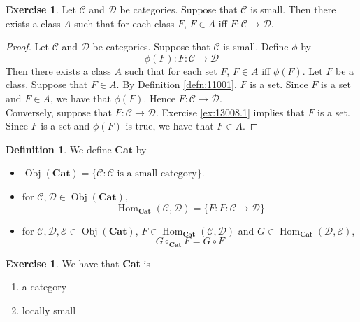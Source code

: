 \documentclass{book}
\theoremstyle{definition}
\newtheorem{defn}[definition]{Definition}
\newtheorem{ex}[definition]{Exercise}
\newcommand{\MC}{\mathcal{C}}
\newcommand{\MD}{\mathcal{D}}
\newcommand{\ME}{\mathcal{E}}
\newcommand{\lex}[1]{\label{ex:#1}}
\newcommand{\rex}[1]{Exercise \ref{ex:#1}}
\newcommand{\ld}[1]{\label{defn:#1}}
\newcommand{\rd}[1]{Definition \ref{defn:#1}}
\DeclareMathOperator{\Obj}{Obj}
\DeclareMathOperator{\Hom}{Hom}
\DeclareMathOperator*{\0}{\mbf{0}}
\DeclareMathOperator*{\1}{\mbf{1}}
\newcommand{\tbf}[1]{\textbf{#1}}
\begin{document}
	\begin{ex} \lex{13008.2}
		Let $\MC$ and $\MD$ be categories. Suppose that $\MC$ is small. Then there exists a class $A$ such that for each class $F$, $F \in A$ iff $F: \MC \rightarrow \MD$.   
	\end{ex}
	
	\begin{proof} 
		Let $\MC$ and $\MD$ be categories. Suppose that $\MC$ is small. Define $\phi$ by 
		$$\phi(F) : F : \MC \rightarrow \MD$$ 
		Then there exists a class $A$ such that for each set $F$, $F \in A$ iff $\phi(F)$. Let $F$ be a class. Suppose that $F \in A$. By \rd{11001}, $F$ is a set. Since $F$ is a set and $F \in A$, we have that $\phi(F)$. Hence $F: \MC \rightarrow \MD$. \\
		Conversely, suppose that $F: \MC \rightarrow \MD$. \rex{13008.1} implies that $F$ is a set. Since $F$ is a set and $\phi(F)$ is true, we have that $F \in A$. 
	\end{proof}
	
	\begin{defn} \ld{13009}
		We define $\tbf{Cat}$ by 
		\begin{itemize}
			\item $\Obj(\tbf{Cat}) = \{\MC: \MC \text{ is a small category}\}$.
			\item for $\MC,\MD \in \Obj(\tbf{Cat})$, 
			$$\Hom_{\tbf{Cat}}(\MC,\MD) = \{F : F: \MC \rightarrow \MD \}$$
			\item for $\MC,\MD, \ME \in \Obj(\tbf{Cat})$, $F \in \Hom_{\tbf{Cat}}(\MC,\MD)$ and $G \in \Hom_{\tbf{Cat}}(\MD, \ME)$, $$G \circ_{\tbf{Cat}} F = G \circ F$$
		\end{itemize}
	\end{defn}


	\begin{ex}  \lex{13010}
		We have that \tbf{Cat} is 
		\begin{enumerate}
			\item a category
			\item locally small
		\end{enumerate} 
	\end{ex}
\end{document}
